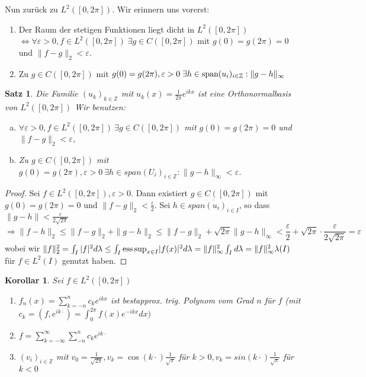 \documentclass[ngerman]{report}
\theoremstyle{plain}%
\newtheorem{thm}{Satz}[chapter]
\newtheorem*{cor*}{Korollar}
\theoremstyle{definition}%
\theoremstyle{myStyle}
\newcommand{\Z}{\mathbb{Z}}
\newcommand{\ess}{\textnormal{ess}}
\newcommand{\aufspan}{\textnormal{span}}
\newcommand{\norm}[1]{\|#1\|}
\newcommand{\df}[1][]{%
	\overset{#1}{\Rightarrow}
}
\newcommand{\ff}[3]{(#1_#2)_{#2\in#3}}
\begin{document}
	Nun zurück zu $L^2([0,2\pi]).$
	Wir erinnern uns vorerst:	 
			\begin{enumerate}
				\item Der Raum der stetigen Funktionen liegt dicht in $L^2([0,2\pi])$\\
				 $\Leftrightarrow \forall \varepsilon > 0, f\in L^2([0,2\pi])\; \exists g\in C([0,2\pi])$ mit 
				$g(0) = g(2\pi) = 0$ und $\norm{f-g}_2 < \varepsilon$.
				\item Zu $g\in C([0,2\pi])$ mit $g(0) = g(2\pi), \varepsilon > 0 \;\exists h\in \aufspan\ff{u}{i}{\Z}: \norm{g-h}_\infty$
			\end{enumerate}
	\begin{thm} 
		Die Familie $\ff{u}{k}{\Z}$ mit $u_k(x) = \frac{1}{2 \pi} e^{ikx}$ ist eine Orthonormalbasis von $L^2([0,2\pi])$ 
		Wir benutzen:	 
			\begin{enumerate}[a)]
				\item $\forall \varepsilon > 0, f\in L^2([0,2\pi]) ~\exists g\in C([0,2\pi])$ mit $g(0) = g(2\pi) = 0$ und $\norm{f-g}_2 < \varepsilon$,
				\item Zu $g\in C([0,2\pi])$ mit $g(0) = g(2\pi), \varepsilon > 0 ~\exists h\in span(U_i)_{i \in \Z}: \norm{g-h}_\infty < \varepsilon$.
			\end{enumerate}

	\end{thm}
	\begin{proof}
		Sei $f\in L^2([0,2\pi]), \varepsilon > 0$.
		Dann existiert $g\in C([0,2\pi])$ mit $g(0) = g(2\pi) = 0$ und $\norm{f-g}_2 < \frac{\varepsilon}{2}$.
		Sei $h\in \overline{span\ff{u}{i}{I}}$, so dass $\norm{g-h} < \frac{\varepsilon}{2\sqrt{2\pi}}$
		$$\df \norm{f-h}_2 \leq \norm{f-g}_2 + \norm{g-h}_2 \leq \norm{f-g}_2 + \sqrt{2\pi} \norm{g-h}_\infty < \frac{\varepsilon}{2} + \sqrt{2\pi} \cdot \frac{\varepsilon}{2\sqrt{2\pi}} = \varepsilon$$
		wobei wir $\|f\|^2_2 = \int_I |f|^2 d\lambda \leq \int_I {\ess \sup}_{x\in I} |f(x)|^2 d\lambda = \|f\|^2_\infty \int_I d\lambda = \|f\|^2_\infty \lambda(I)$ für $f\in L^2(I)$ genutzt haben.
	\end{proof}

	\begin{cor*}
Sei $f\in L^2([0,2\pi])$
		\begin{enumerate}
			\item $f_n(x) = \sum_{k=-n}^n c_k e^{ikx}$ ist bestapprox. trig. Polynom vom Grad $n$ für $f$ (mit $c_k = (f,e^{ik\cdot })=\int_{0}^{2\pi} f(x) e^{-ikx} dx)$ 
			\item $f = \sum_{k= -\infty}^{\infty} \sum_{-n}^n c_k e^{ik\cdot} $
			\item $\ff{v}{i}{\Z}$ mit $v_0 = \frac{1}{\sqrt{2\pi}}, v_k = \cos(k\cdot) \frac{1}{\sqrt{\pi}} $ für $ k>0, v_k = sin(k\cdot) \frac{1}{\sqrt{\pi}} $ für $k< 0$
		\end{enumerate}
	\end{cor*}
\end{document}

